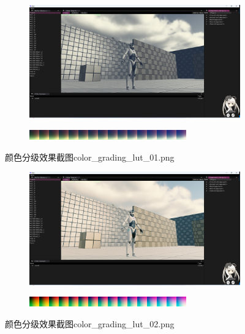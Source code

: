 \documentclass{ctexart}
\begin{document}
    \begin{figure}[!htb]
    	\centering
    	\begin{subfigure}{1.0\textwidth}
    		\includegraphics[width=\textwidth]{screen_shot_color_grading_map_color_grading_lut_01.png}
    	\end{subfigure}
    	\begin{subfigure}{1.0\textwidth}
    		\includegraphics[width=\textwidth]{color_grading_lut_01.png}
    	\end{subfigure}  	
    	\caption{颜色分级效果截图color\_grading\_lut\_01.png}
    \end{figure}
     \begin{figure}[!htb]
    	\centering
    	\begin{subfigure}{1.0\textwidth}
    		\includegraphics[width=\textwidth]{screen_shot_color_grading_map_color_grading_lut_02.png}
    	\end{subfigure}
    	\begin{subfigure}{1.0\textwidth}
    		\includegraphics[width=\textwidth]{color_grading_lut_02.png}
    	\end{subfigure}  	
    	\caption{颜色分级效果截图color\_grading\_lut\_02.png}
    \end{figure}  
\end{document}
